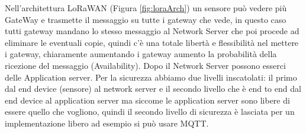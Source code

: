 \documentclass[11pt, twocolumn]{article}
\begin{document}
Nell'architettura LoRaWAN (Figura \ref{fig:loraArch}) un sensore può vedere più GateWay e trasmette il messaggio su tutte i gateway che vede, in questo caso tutti gateway mandano lo stesso messaggio al Network Server che poi procede ad eliminare le eventuali copie, quindi c'è una totale libertà e flessibilità nel mettere i gateway, chiaramente aumentando i gateway aumento la probabilità della ricezione del messaggio (Availability).
Dopo il Network Server possono esserci delle Application server.
Per la sicurezza abbiamo due livelli inscatolati: il primo dal end device (sensore) al network server e il secondo livello che è end to end dal end device al application server  ma siccome le application server sono libere di essere quello che vogliono, quindi il secondo livello di sicurezza è lasciata per un implementazione libero ad esempio si può usare MQTT. 
\end{document}
